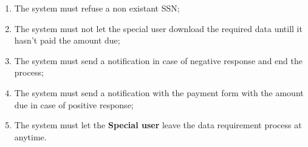 \begin{enumerate}
  \item The system must refuse a non existant SSN;
  \item The system must not let the special user download the required data untill it hasn't paid the amount due;
  \item The system must send a notification in case of negative response and end the process;
  \item The system must send a notification with the payment form with the amount due in case of positive response;
  \item The system must let the \textbf{Special user} leave the data requirement process at anytime.
\end{enumerate}

